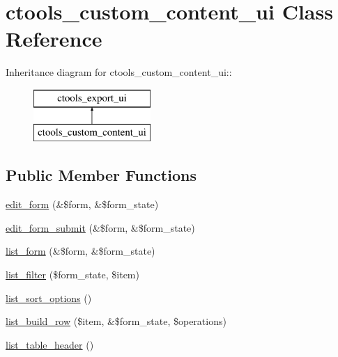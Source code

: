 \hypertarget{classctools__custom__content__ui}{
\section{ctools\_\-custom\_\-content\_\-ui Class Reference}
\label{classctools__custom__content__ui}
}
Inheritance diagram for ctools\_\-custom\_\-content\_\-ui::\begin{figure}[H]
\begin{center}
\leavevmode
\includegraphics[height=2cm]{classctools__custom__content__ui}
\end{center}
\end{figure}
\subsection*{Public Member Functions}
\begin{DoxyCompactItemize}
\item 
\hyperlink{classctools__custom__content__ui_ab0aa3104e4e701edbf82939f4d07b866}{edit\_\-form} (\&\$form, \&\$form\_\-state)
\item 
\hyperlink{classctools__custom__content__ui_a77ac2a98884dcc134470d1e28e01246e}{edit\_\-form\_\-submit} (\&\$form, \&\$form\_\-state)
\item 
\hyperlink{classctools__custom__content__ui_a530636bea39fd3a90e7ffca2760643ec}{list\_\-form} (\&\$form, \&\$form\_\-state)
\item 
\hyperlink{classctools__custom__content__ui_a3b389db39e1d13eb7beca1c35e8edf16}{list\_\-filter} (\$form\_\-state, \$item)
\item 
\hyperlink{classctools__custom__content__ui_acc4d7c6bc7a3f3f744882157ca6512c4}{list\_\-sort\_\-options} ()
\item 
\hyperlink{classctools__custom__content__ui_a56ee3ac6704a7d3736da6d9cc6b229d4}{list\_\-build\_\-row} (\$item, \&\$form\_\-state, \$operations)
\item 
\hyperlink{classctools__custom__content__ui_a26ea6386756947b59995763ff673e1aa}{list\_\-table\_\-header} ()
\end{DoxyCompactItemize}


